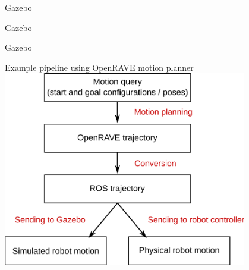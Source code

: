 \documentclass[9pt]{beamer}
\begin{document}
\begin{section}{Gazebo}
\begin{frame}{Gazebo}
    \end{frame}
    \begin{frame}{Gazebo}
        \begin{block}{Example pipeline using OpenRAVE motion planner}
            \centering
            \includegraphics[width=0.8\textwidth,trim={0cm 0cm 0cm 0cm},clip]{robot_simulation_pipeline.png}
        \end{block}
    \end{frame}    
    

\end{section}
\end{document}
